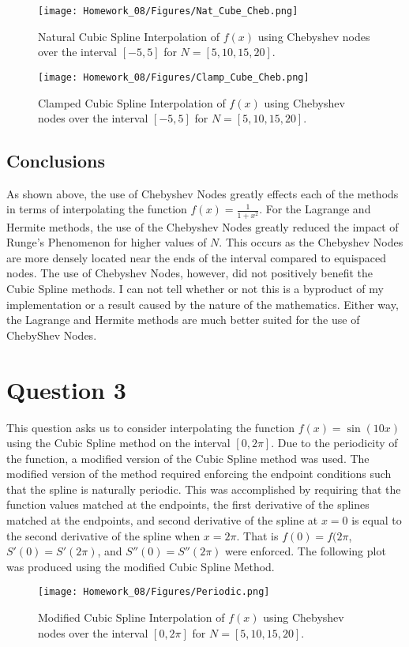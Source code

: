 \documentclass{article}
\begin{document}
\begin{figure}[h!]
    \centering
    \texttt{[image: Homework\_08/Figures/Nat\_Cube\_Cheb.png]}
    \caption{Natural Cubic Spline Interpolation of \(f(x)\) using Chebyshev nodes over the interval \([-5,5]\) for \(N = [5,10,15,20]\).}
    \label{fig:Nat_Cube_Cheb}
\end{figure}

\begin{figure}[h!]
    \centering
    \texttt{[image: Homework\_08/Figures/Clamp\_Cube\_Cheb.png]}
    \caption{Clamped Cubic Spline Interpolation of \(f(x)\) using Chebyshev nodes over the interval \([-5,5]\) for \(N = [5,10,15,20]\).}
    \label{fig:Clamp_Cube_Cheb}
\end{figure}

\subsection{Conclusions}
As shown above, the use of Chebyshev Nodes greatly effects each of the methods in terms of interpolating the function \(f(x) = \frac{1}{1+x^2}\). For the Lagrange and Hermite methods, the use of the Chebyshev Nodes greatly reduced the impact of Runge's Phenomenon for higher values of \(N\). This occurs as the Chebyshev Nodes are more densely located near the ends of the interval compared to equispaced nodes. The use of Chebyshev Nodes, however, did not positively benefit the Cubic Spline methods. I can not tell whether or not this is a byproduct of my implementation or a result caused by the nature of the mathematics. Either way, the Lagrange and Hermite methods are much better suited for the use of ChebyShev Nodes.


\section{Question 3}
This question asks us to consider interpolating the function \(f(x)=\sin(10x)\) using the Cubic Spline method on the interval \([0,2\pi]\). Due to the periodicity of the function, a modified version of the Cubic Spline method was used. The modified version of the method required enforcing the endpoint conditions such that the spline is naturally periodic. This was accomplished by requiring that the function values matched at the endpoints, the first derivative of the splines matched at the endpoints, and second derivative of the spline at \(x=0\) is equal to the second derivative of the spline when \(x=2\pi\). That is \(f(0)=f(2\pi\), \(S'(0)=S'(2\pi)\), and \(S''(0)=S''(2\pi)\) were enforced. The following plot was produced using the modified Cubic Spline Method.
\begin{figure}[h!]
    \centering
    \texttt{[image: Homework\_08/Figures/Periodic.png]}
    \caption{Modified Cubic Spline Interpolation of \(f(x)\) using Chebyshev nodes over the interval \([0,2\pi]\) for \(N = [5,10,15,20]\).}
    \label{fig:Periodic}
\end{figure}
\end{document}
